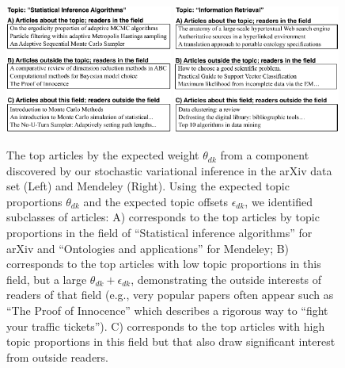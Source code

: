 \documentclass{article}
\begin{document}
\begin{figure}[t]
\centering
\includegraphics[width=0.49\textwidth]{../fig/pdf/arxiv-exploratory.pdf}
\includegraphics[width=0.49\textwidth]{../fig/pdf/mendeley-exploratory.pdf}
\caption{
\footnotesize{
The top articles by the expected
weight $\theta_{dk}$ from a component discovered by our stochastic
variational inference in the arXiv data set (Left) and Mendeley (Right).
Using the expected topic
proportions $\theta_{dk}$ and the expected topic offsets $\epsilon_{dk}$,
we identified subclasses of articles: A) corresponds
to the top articles by topic proportions in the field of ``Statistical
inference algorithms'' for arXiv and ``Ontologies and applications'' for Mendeley; B) corresponds to the top
articles with low topic proportions in this field, but a large
$\theta_{dk} + \epsilon_{dk}$, demonstrating the outside interests of
readers of that field (e.g., very popular papers often appear such as
``The Proof of Innocence'' which describes a rigorous way to ``fight your
traffic tickets''). 
C)  corresponds to the top articles with high topic proportions in this
field but that also draw significant interest from outside readers. }}
\label{fig:arxiv-exploratory}
\vspace{-0.5cm}
\end{figure}
\end{document}
